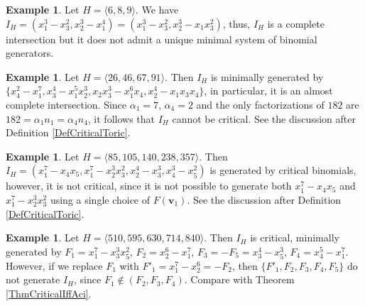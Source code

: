 \documentclass[11pt,twoside]{amsart}
\def\bv{{\mathbf v}}
\theoremstyle{definition}
\newtheorem{ex}[Theorem]{Example}
\numberwithin{equation}{section}
\begin{document}
\begin{ex}\label{CInotunique}
Let $H=\langle 6,8,9\rangle$. We have $I_H=(x_1^3-x_3^2,x_2^3-x_1^4)=(x_1^3-x_3^2,x_2^3-x_1x_3^2)$, thus, $I_H$ is a complete intersection but it does not admit a unique minimal system of binomial generators.
\end{ex}

\begin{ex}\label{acinotcrit}
Let $H=\langle 26,46,67,91 \rangle$. 
Then $I_H$ is minimally generated by $\{x_4^2-x_1^7,x_3^4-x_1^5x_2^3,x_2x_3^3-x_1^6x_4,x_2^4-x_1x_3x_4\}$,
in particular, it is an almost complete intersection.
Since $\alpha_1=7$, $\alpha_4=2$ and the only factorizations of $182$ are $182=\alpha_1 n_1 = \alpha_4 n_4$, it follows that $I_H$ cannot be critical.
See the discussion after  Definition \ref{DefCriticalToric}.
\end{ex}

\begin{ex}\label{genbycritnotcrit}
Let $H=\langle 85,105,140,238,357 \rangle$. Then $I_H=(x_1^7-x_4x_5,x_1^7-x_2^3x_3^2,x_2^4-x_3^3,x_4^3-x_5^2)$ is generated by critical binomials, however, it is not critical,
since it is not possible to generate both  $x_1^7-x_4x_5$ and $x_1^7-x_2^3x_3^2$ using a single choice of $F(\bv_1)$.
See the discussion after  Definition \ref{DefCriticalToric}.
\end{ex}

\begin{ex}\label{critnotanychoice}
Let $H=\langle 510,595,630,714,840 \rangle$. Then $I_H$ is critical, minimally generated by  $F_1=x_1^7-x_3^3x_5^2$, $F_2 = x_2^6-x_1^7$, $F_3=-F_5=x_3^4-x_5^3$, $F_4=x_4^5-x_1^7$. However, if we replace $F_1$ with $F'_1=x_1^7-x_2^6 = -F_2$, then $\{F'_1,F_2,F_3,F_4,F_5\}$ do not generate $I_H$, since $F_1 \notin (F_2,F_3,F_4)$.
Compare with Theorem \ref{ThmCriticalIffAci}.
\end{ex}
 
\end{document}
